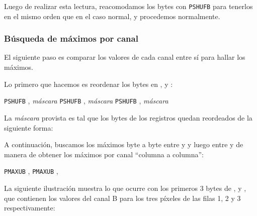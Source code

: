 Luego de realizar esta lectura, reacomodamos los bytes con \texttt{PSHUFB}
para tenerlos en el mismo orden que en el caso normal, y procedemos normalmente.



\subsubsection{Búsqueda de máximos por canal}

El siguiente paso es comparar los valores de cada canal entre sí para hallar los máximos.

Lo primero que hacemos es reordenar los bytes en ,  y :

\begin{pseudocodigo}
    \STATE \texttt{PSHUFB} , \textit{máscara}
    \STATE \texttt{PSHUFB} , \textit{máscara}
    \STATE \texttt{PSHUFB} , \textit{máscara}
\end{pseudocodigo}

La \textit{máscara} provista es tal que los bytes de los registros quedan
reordeados de la siguiente forma:

\begin{center}
\end{center}

A continuación, buscamos los máximos byte a byte entre  y  y luego entre
 y  de manera de obtener los máximos por canal ``columna a columna'':

\begin{pseudocodigo}
    \STATE \texttt{PMAXUB} , 
    \STATE \texttt{PMAXUB} ,     
\end{pseudocodigo}

La siguiente ilustración muestra lo que ocurre con los primeros 3 bytes de
,  y , que contienen los valores del canal B para los
tres píxeles de las filas 1, 2 y 3 respectivamente:

